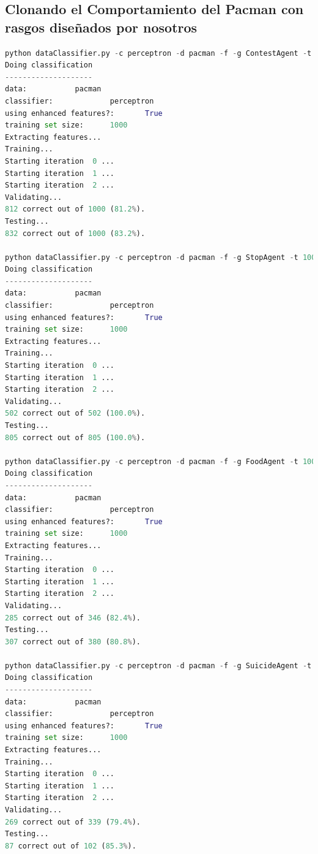 \documentclass{report}
\begin{document}
      \subsection{Clonando el Comportamiento del Pacman con rasgos diseñados por nosotros}
        \begin{lstlisting}[language=Python, caption=Ejecución del clonador de comportamiento del pacman con rasgos diseñados por nosotros]
python dataClassifier.py -c perceptron -d pacman -f -g ContestAgent -t 1000 -s 1000
Doing classification
--------------------
data:           pacman
classifier:             perceptron
using enhanced features?:       True
training set size:      1000
Extracting features...
Training...
Starting iteration  0 ...
Starting iteration  1 ...
Starting iteration  2 ...
Validating...
812 correct out of 1000 (81.2%).
Testing...
832 correct out of 1000 (83.2%).

python dataClassifier.py -c perceptron -d pacman -f -g StopAgent -t 1000 -s 1000
Doing classification
--------------------
data:           pacman
classifier:             perceptron
using enhanced features?:       True
training set size:      1000
Extracting features...
Training...
Starting iteration  0 ...
Starting iteration  1 ...
Starting iteration  2 ...
Validating...
502 correct out of 502 (100.0%).
Testing...
805 correct out of 805 (100.0%).

python dataClassifier.py -c perceptron -d pacman -f -g FoodAgent -t 1000 -s 1000
Doing classification
--------------------
data:           pacman
classifier:             perceptron
using enhanced features?:       True
training set size:      1000
Extracting features...
Training...
Starting iteration  0 ...
Starting iteration  1 ...
Starting iteration  2 ...
Validating...
285 correct out of 346 (82.4%).
Testing...
307 correct out of 380 (80.8%).

python dataClassifier.py -c perceptron -d pacman -f -g SuicideAgent -t 1000 -s 1000
Doing classification
--------------------
data:           pacman
classifier:             perceptron
using enhanced features?:       True
training set size:      1000
Extracting features...
Training...
Starting iteration  0 ...
Starting iteration  1 ...
Starting iteration  2 ...
Validating...
269 correct out of 339 (79.4%).
Testing...
87 correct out of 102 (85.3%).
        \end{lstlisting}
\end{document}
